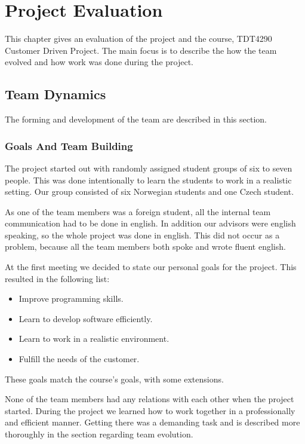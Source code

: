 \chapter{Project Evaluation}
This chapter gives an evaluation of the project and the course, TDT4290 Customer Driven Project. The main focus is to describe the how the team evolved and how work was done during the project.   

\section{Team Dynamics}
The forming and development of the team are described in this section.
\subsection{Goals And Team Building}
The project started out with randomly assigned student groups of six to seven people. This was done intentionally to learn the students to work in a realistic setting. Our group consisted of six Norwegian students and one Czech student. 

As one of the team members was a foreign student, all the internal team communication had to be done in english. In addition our advisors were english speaking, so the whole project was done in english. This did not occur as a problem, because all the team members both spoke and wrote fluent english.

At the first meeting we decided to state our personal goals for the project. This resulted in the following list:
\begin{itemize}
\item Improve programming skills.
\item Learn to develop software efficiently.
\item Learn to work in a realistic environment.
\item Fulfill the needs of the customer. 
\end{itemize}
These goals match the course's goals, with some extensions.

None of the team members had any relations with each other when the project started. During the project we learned how to work together in a professionally and efficient manner. Getting there was a demanding task and is described more thoroughly in the section regarding team evolution.

